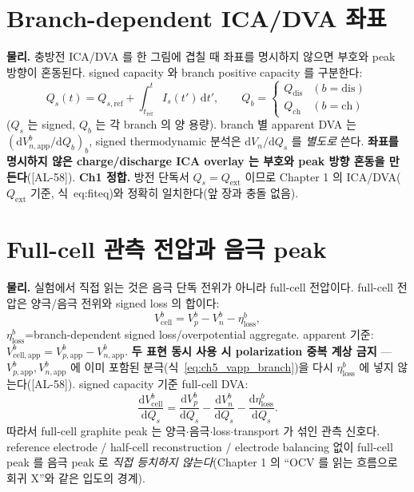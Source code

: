 \documentclass[11pt,a4paper]{article}
\newcommand{\dd}{\mathrm{d}}
\newcommand{\app}{\mathrm{app}}
\newcommand{\cell}{\mathrm{cell}}
\newcommand{\ext}{\mathrm{ext}}
\newcommand{\dis}{\mathrm{dis}}
\newcommand{\chg}{\mathrm{ch}}
\newcommand{\loss}{\mathrm{loss}}
\newcommand{\AL}[1]{\textsf{[AL-#1]}}
\begin{document}
\section{Branch-dependent ICA/DVA 좌표}\label{sec:ch5_icadva}
\textbf{물리.} 충방전 ICA/DVA 를 한 그림에 겹칠 때 좌표를 명시하지 않으면 부호와 peak 방향이 혼동된다. signed
capacity 와 branch positive capacity 를 구분한다:
\begin{equation}
Q_s(t)=Q_{s,\mathrm{ref}}+\int_{t_{\mathrm{ref}}}^t I_s(t')\,\dd t',\qquad
Q_b=\begin{cases}Q_\dis & (b=\dis)\\ Q_\chg & (b=\chg)\end{cases}
\label{eq:ch5_signed_cap}
\end{equation}
($Q_s$ 는 signed, $Q_b$ 는 각 branch 의 양 용량). branch 별 apparent DVA 는 $(\dd V_{n,\app}^b/\dd Q_b)_b$,
signed thermodynamic 분석은 $\dd V_n/\dd Q_s$ 를 \emph{별도로} 쓴다. \textbf{좌표를 명시하지 않은
charge/discharge ICA overlay 는 부호와 peak 방향 혼동을 만든다}(\AL{58}). \textbf{Ch1 정합.} 방전 단독서
$Q_s=Q_\ext$ 이므로 Chapter 1 의 ICA/DVA($Q_\ext$ 기준, 식~eq:fiteq)와 정확히 일치한다(앞 장과 충돌 없음).

\section{Full-cell 관측 전압과 음극 peak}\label{sec:ch5_fullcell}
\textbf{물리.} 실험에서 직접 읽는 것은 음극 단독 전위가 아니라 full-cell 전압이다. full-cell 전압은 양극/음극
전위와 signed loss 의 합이다:
\begin{equation}
V_\cell^b=V_p^b-V_n^b-\eta_\loss^b,
\label{eq:ch5_fullcell}
\end{equation}
$\eta_\loss^b$=branch-dependent signed loss/overpotential aggregate. apparent 기준:
$V_{\cell,\app}^b=V_{p,\app}^b-V_{n,\app}^b$. \textbf{두 표현 동시 사용 시 polarization 중복 계상 금지} —
$V_{p,\app}^b,V_{n,\app}^b$ 에 이미 포함된 분극(식~\eqref{eq:ch5_vapp_branch})을 다시 $\eta_\loss^b$ 에 넣지
않는다(\AL{58}). signed capacity 기준 full-cell DVA:
\begin{equation}
\frac{\dd V_\cell^b}{\dd Q_s}=\frac{\dd V_p^b}{\dd Q_s}-\frac{\dd V_n^b}{\dd Q_s}-\frac{\dd\eta_\loss^b}{\dd Q_s}.
\label{eq:ch5_fullcell_dva}
\end{equation}
따라서 full-cell graphite peak 는 양극$\cdot$음극$\cdot$loss$\cdot$transport 가 섞인 관측 신호다. reference
electrode / half-cell reconstruction / electrode balancing 없이 full-cell peak 를 음극 peak 로 \emph{직접
등치하지 않는다}(Chapter 1 의 ``OCV 를 읽는 흐름으로 회귀 X''와 같은 입도의 경계).
\end{document}
